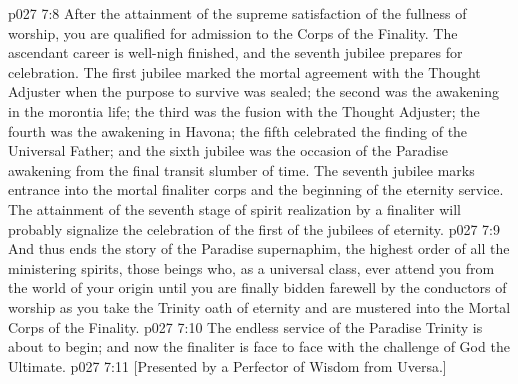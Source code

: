 \pc \vs p027 7:8 After the attainment of the supreme satisfaction of the fullness of worship, you are qualified for admission to the Corps of the Finality. The ascendant career is well\hyp{}nigh finished, and the seventh jubilee prepares for celebration. The first jubilee marked the mortal agreement with the Thought Adjuster when the purpose to survive was sealed; the second was the awakening in the morontia life; the third was the fusion with the Thought Adjuster; the fourth was the awakening in Havona; the fifth celebrated the finding of the Universal Father; and the sixth jubilee was the occasion of the Paradise awakening from the final transit slumber of time. The seventh jubilee marks entrance into the mortal finaliter corps and the beginning of the eternity service. The attainment of the seventh stage of spirit realization by a finaliter will probably signalize the celebration of the first of the jubilees of eternity.
\pc \vs p027 7:9 And thus ends the story of the Paradise supernaphim, the highest order of all the ministering spirits, those beings who, as a universal class, ever attend you from the world of your origin until you are finally bidden farewell by the conductors of worship as you take the Trinity oath of eternity and are mustered into the Mortal Corps of the Finality.
\vs p027 7:10 The endless service of the Paradise Trinity is about to begin; and now the finaliter is face to face with the challenge of God the Ultimate.\plusone
\vsetoff
\vs p027 7:11 [Presented by a Perfector of Wisdom from Uversa.]
